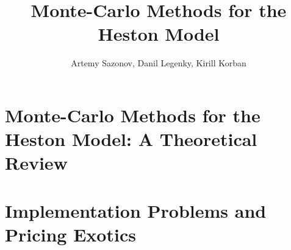 \documentclass[]{vegareport}
\title{Monte-Carlo Methods for the Heston Model}
\author{Artemy Sazonov, Danil Legenky, Kirill Korban}
\begin{document}
    \maketitle

    \introduction
        
    
    \part{Monte-Carlo Methods for the Heston Model: A Theoretical Review}
        

    \part{Implementation Problems and Pricing Exotics}
        
    
    \conclusion
        

\end{document}
